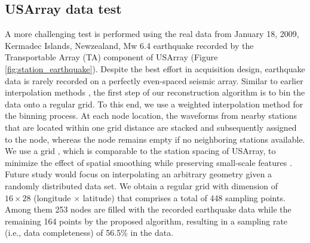 \subsection*{USArray data test} A more challenging test is performed using the real data from January 18, 2009, Kermadec Islands, Newzealand, Mw 6.4 earthquake recorded by the Transportable Array (TA) component of USArray (Figure \ref{fig:station_earthquake}). Despite the best effort in acquisition design, earthquake data is rarely recorded on a perfectly even-spaced seismic array. Similar to earlier  interpolation methods \cite{neal1999imaging,dokht2016singular,schneider2017improvement}, the first step of our reconstruction algorithm is to bin the data onto a regular grid. To this end, we use a weighted interpolation method for the binning process. At each node location, the waveforms from nearby stations that are located within one grid distance are stacked and subsequently assigned to the node, whereas the node remains empty if no neighboring stations  available.  We use a grid , which is comparable to the station spacing of USArray, to minimize the effect of spatial smoothing while preserving small-scale features . Future study would focus on interpolating an arbitrary geometry given a randomly distributed data set.  We obtain a regular grid with  dimension of $16\times 28$ (longitude $\times$  latitude) that comprises a total of 448 sampling points.  Among them 253 nodes are filled with the recorded earthquake data while the remaining 164 points  by the proposed algorithm, resulting in a sampling rate (i.e., data completeness) of 56.5\% in the data.


